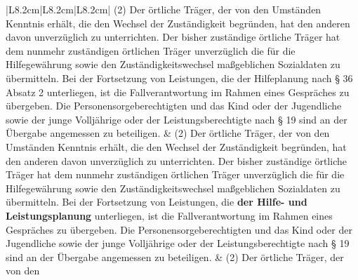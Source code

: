 \documentclass[10pt,a4paper,landscape]{article}
\begin{document}
\begin{longtable}{|L{8.2cm}|L{8.2cm}|L{8.2cm}|}
\hhline{|---|}
(2) Der örtliche Träger, der von den  \newline Umständen Kenntnis erhält, die den  \newline Wechsel der Zuständigkeit begründen, hat  \newline den anderen davon unverzüglich zu  \newline unterrichten. Der bisher zuständige örtliche  \newline Träger hat dem nunmehr zuständigen  \newline örtlichen Träger unverzüglich die für die  \newline Hilfegewährung sowie den  \newline Zuständigkeitswechsel maßgeblichen  \newline Sozialdaten zu übermitteln. Bei der  \newline Fortsetzung von Leistungen, die der  \newline \textcolor{diffred}{Hilfeplanung nach \S{} 36 Absatz 2}  \newline unterliegen, ist die Fallverantwortung im  \newline Rahmen eines Gespräches zu übergeben.  \newline Die Personensorgeberechtigten und das  \newline Kind oder der Jugendliche sowie der junge  \newline Volljährige oder der Leistungsberechtigte  \newline nach \S{} 19 sind an der Übergabe  \newline angemessen zu beteiligen. & (2) Der örtliche Träger, der von den  \newline Umständen Kenntnis erhält, die den  \newline Wechsel der Zuständigkeit begründen, hat  \newline den anderen davon unverzüglich zu  \newline unterrichten. Der bisher zuständige örtliche  \newline Träger hat dem nunmehr zuständigen  \newline örtlichen Träger unverzüglich die für die  \newline Hilfegewährung sowie den  \newline Zuständigkeitswechsel maßgeblichen  \newline Sozialdaten zu übermitteln. Bei der  \newline Fortsetzung von Leistungen, die \textbf{der Hilfe-  \newline und Leistungsplanung} unterliegen, ist die  \newline Fallverantwortung im Rahmen eines  \newline Gespräches zu übergeben. Die  \newline Personensorgeberechtigten und das Kind  \newline oder der Jugendliche sowie der junge  \newline Volljährige oder der Leistungsberechtigte  \newline nach \S{} 19 sind an der Übergabe  \newline angemessen zu beteiligen. & (2) Der örtliche Träger, der von den  
\end{longtable}
\end{document}
